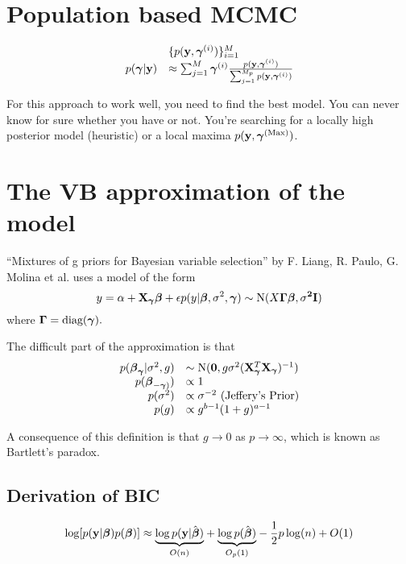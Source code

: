 \documentclass{amsart}
\begin{document}
\section{Population based MCMC}

\[
\begin{array}{rl}
		&\{ p({\bf y}, {\boldsymbol \gamma}^{(i)}) \}_{i=1}^M \\
	p({\boldsymbol \gamma} | {\bf y}) &\approx \sum_{j=1}^M {\boldsymbol \gamma}^{(i)} \frac{p({\bf y}, {\boldsymbol \gamma}^{(i)})}{\sum_{j=1}^{M_p} p({\bf y}, {\boldsymbol \gamma}^{(i)})}
\end{array}
\]

For this approach to work well, you need to find the best model. You can never know for sure whether you have
or not. You're searching for a locally high posterior model (heuristic) or a local maxima $p({\bf y}, {\boldsymbol \gamma}^{(\text{Max})})$.

\section{The VB approximation of the model}

\def \vGamma {\vectorfontone{\Gamma}}
\def \N {\text{N}}
``Mixtures of g priors for Bayesian variable selection'' by F. Liang, R. Paulo, G. Molina et al. uses a model
of the form
\[
	y = \alpha + \mX_\vgamma \vbeta + \epsilon \\
	p(y | \vbeta, \sigma^2, \vgamma) \sim \N(X \vGamma \vbeta, \sigma^2 I)
\]
where $\vGamma = \diag(\vgamma).$

The difficult part of the approximation is that
\[
\begin{array}{rl}
	p(\vbeta_\vgamma | \sigma^2, g) &\sim \N(\vzero, g \sigma^2 (\mX_\vgamma^T \mX_\vgamma)^{-1}) \\
	p(\vbeta_{-\vgamma)}) &\propto 1 \\
	p(\sigma^2) &\propto \sigma^{-2} \text{ (Jeffery's Prior)} \\
	p(g) &\propto g^{b-1} (1 + g)^{a-1} \\
\end{array}
\]

A consequence of this definition is that $g \to 0$ as $p \to \infty$, which is known as Bartlett's paradox.

\subsection{Derivation of BIC}

\[
	\log [ p({\bf y} | {\boldsymbol \beta}) p({\boldsymbol \beta}) ] \approx \underset{O(n)}{\underbrace{\log p({\bf y} | \hat{{\boldsymbol \beta}})}}
												+ \underset{O_p(1)}{\underbrace{\log p(\hat{{\boldsymbol \beta}})}}
												-  \frac{1}{2} p \log (n) + O(1)
\]
\end{document}
